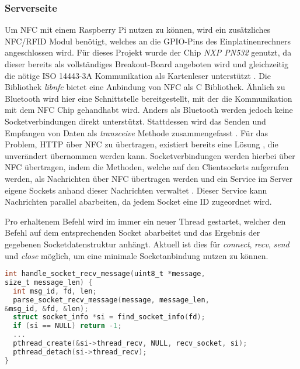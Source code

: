     \subsubsection{Serverseite}
	    Um NFC mit einem Raspberry Pi nutzen zu können, wird ein zusätzliches NFC/RFID Modul benötigt, welches an die GPIO-Pins des Einplatinenrechners angeschlossen wird. Für dieses Projekt wurde der Chip {\it NXP PN532} genutzt, da dieser bereits als vollständiges Breakout-Board angeboten wird und gleichzeitig die nötige ISO 14443-3A Kommunikation als Kartenleser unterstützt \cite{nxpChip}.
	    Die Bibliothek {\it libnfc} bietet eine Anbindung von NFC als C Bibliothek. Ähnlich zu Bluetooth wird hier eine Schnittstelle bereitgestellt, mit der die Kommunikation mit dem NFC Chip gehandhabt wird. Anders als Bluetooth werden jedoch keine Socketverbindungen direkt unterstützt. Stattdessen wird das Senden und Empfangen von Daten als {\it transceive} Methode zusammengefasst \cite{libnfc}.
	    Für das Problem, HTTP über NFC zu übertragen, existiert bereits eine Lösung \cite{nfcSocketsBlog}, die unverändert übernommen werden kann. Socketverbindungen werden hierbei über NFC übertragen, indem die Methoden, welche auf den Clientsockets aufgerufen werden, als Nachrichten über NFC übertragen werden und ein Service im Server eigene Sockets anhand dieser Nachrichten verwaltet \cite{nfcSocketsBlog}. Dieser Service kann Nachrichten parallel abarbeiten, da jedem Socket eine ID zugeordnet wird. 
	    
	    Pro erhaltenem Befehl wird im  immer ein neuer Thread gestartet, welcher den Befehl auf dem entsprechenden Socket abarbeitet und das Ergebnis der gegebenen Socketdatenstruktur anhängt. Aktuell ist dies für {\it connect}, {\it recv}, {\it send} und {\it close} möglich, um eine minimale Socketanbindung nutzen zu können.

	    \begin{lstlisting}[frame=bt, label={lst:nfc:recv}, language=C, caption=Datenempfang über NFC (Servercode in C) \cite{nfcSockets}]
int handle_socket_recv_message(uint8_t *message,
size_t message_len) {
  int msg_id, fd, len;
  parse_socket_recv_message(message, message_len,
&msg_id, &fd, &len);
  struct socket_info *si = find_socket_info(fd);
  if (si == NULL) return -1;
  ...
  pthread_create(&si->thread_recv, NULL, recv_socket, si);
  pthread_detach(si->thread_recv);
}
        \end{lstlisting}
	    
